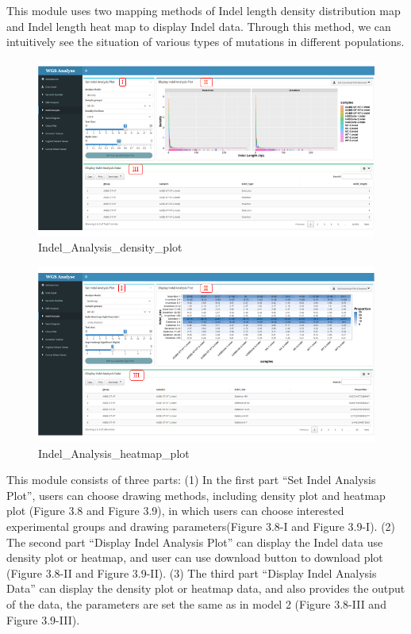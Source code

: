 \documentclass[
]{book}
\theoremstyle{definition}
\theoremstyle{definition}
\theoremstyle{definition}
\theoremstyle{definition}
\theoremstyle{remark}
\begin{document}
This module uses two mapping methods of Indel length density distribution map and Indel length heat map to display Indel data. Through this method, we can intuitively see the situation of various types of mutations in different populations.

\begin{figure}
\includegraphics[width=1\linewidth]{figure/3.Indel_Analysis_density_plot_1} \caption{Indel_Analysis_density_plot}\label{fig:unnamed-chunk-13}
\end{figure}

\begin{figure}
\includegraphics[width=1\linewidth]{figure/3.Indel_Analysis_heatmap_1} \caption{Indel_Analysis_heatmap_plot}\label{fig:unnamed-chunk-14}
\end{figure}

This module consists of three parts: (1) In the first part ``Set Indel Analysis Plot'', users can choose drawing methods, including density plot and heatmap plot (Figure 3.8 and Figure 3.9), in which users can choose interested experimental groups and drawing parameters(Figure 3.8-I and Figure 3.9-I). (2) The second part ``Display Indel Analysis Plot'' can display the Indel data use density plot or heatmap, and user can use download button to download plot (Figure 3.8-II and Figure 3.9-II). (3) The third part ``Display Indel Analysis Data'' can display the density plot or heatmap data, and also provides the output of the data, the parameters are set the same as in model 2 (Figure 3.8-III and Figure 3.9-III).
\end{document}
